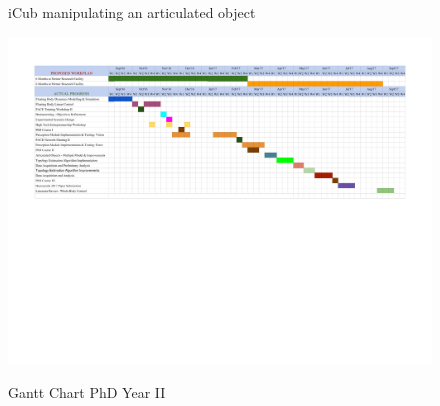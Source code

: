 \documentclass[12pt,a4paper]{report}
\begin{document}
\begin{figure}[!ht]
\begin{subfigure}[b]{0.5\textwidth}
			\caption{  }
			\label{icub_mani3}
	 	\end{subfigure}		
		\caption{iCub manipulating an articulated object}
		\label{icub_mani}
\end{figure}

\begin{landscape}
	\begin{figure}[!ht]
		\centering
		\caption{Gantt Chart PhD Year II}
		\includegraphics[scale=1]{PhD_year2_gantt.pdf}
		\label{gantt}
	\end{figure}
\end{landscape}

\renewcommand{\bibsection}{\subsection{\bibname}}
\renewcommand{\bibname}{\large{References}}


\end{document}
